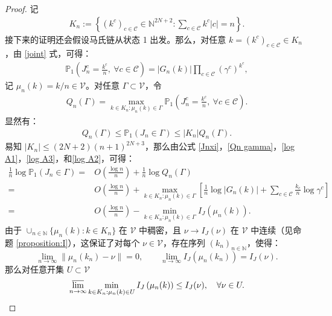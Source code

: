 \begin{proof}
记
\begin{align}\label{set:K_n}
K_n := \left\{(k^c)_{c\in \mathcal{C}}\in \mathbb{N}^{2N+2}: \sum_{c \in \mathcal{C}} k^{c} |c| =n \right\}.
\end{align}
接下来的证明还会假设马氏链从状态 1 出发。那么，对任意 $k=(k^c)_{c\in\mathcal{C}}\in K_n$，由 \eqref{joint} 式，可得：
\begin{align}\label{Jnxi}
\mathbb{P}_1\left(J^c_{n}= \frac{k^c}{n},\ \forall c\in \mathcal{C}\right)
= |G_n(k)| \prod_{c\in\mathcal{C}}\left(\gamma^c\right)^{k^c},
\end{align}
记 $\mu_n(k) = k/n\in\mathcal{V}$。对任意 $\Gamma\subset \mathcal{V}$，令
\begin{align*}
Q_n(\Gamma) = \max_{k\in K_n: \mu_n(k) \in \Gamma}
\mathbb{P}_1\left(J^c_{n} = \frac{k^c}{n},\ \forall c\in\mathcal{C}\right).
\end{align*}
显然有：
\begin{align}\label{Qn gamma}
	Q_n(\Gamma)
	\le \mathbb{P}_1\left(J_{n} \in \Gamma\right)
	\le |K_n| Q_n(\Gamma).
\end{align}
易知 $|K_n| \le (2N+2)(n+1)^{2N+3}$，那么由公式 \eqref{Jnxi}，\eqref{Qn gamma}，\eqref{log A1}，\eqref{log A3}，和\eqref{log A2}，可得：
\begin{equation}\label{1 n log P}
	\begin{split}
	\frac{1}{n}\log\mathbb{P}_1\left(J_{n} \in \Gamma\right)=&O\left(\frac{\log n}{n}\right)+\frac{1}{n}\log Q_n(\Gamma)\\
	=&O\left(\frac{\log n}{n}\right)+\max_{k\in K_n: \mu_n(k) \in \Gamma}\left[\frac{1}{n}\log |G_{n}(k)|+\sum_{c \in \mathcal{C}}\frac{k_c}{n}\log \gamma^c\right]\\
	=&O\left(\frac{\log n}{n}\right)-\min_{k\in K_n: \mu_n(k) \in \Gamma}I_J\left(\mu_{n}(k)\right).
	\end{split}
\end{equation}
由于 $\cup_{n\in\mathbb{N}} \{\mu_{n}(k):k\in K_n\}$ 在 $\mathcal{V}$ 中稠密，且 $\nu\to I_J(\nu)$ 在 $\mathcal{V}$ 中连续（见命题 \ref{proposition:I}），这保证了对每个 $\nu\in \mathcal{V}$，存在序列 $(k_n)_{n\in \mathbb{N}}$，使得：
\begin{equation*}
\lim_{n\to\infty} \|\mu_{n}(k_n)-\nu\| = 0, \qquad \lim_{n\to\infty} I_J\left(\mu_{n}(k_n)\right) = I_J(\nu).
\end{equation*}
那么对任意开集 $U\subset \mathcal{V}$
\begin{equation*}
\varlimsup_{n\to\infty}\min_{k\in K_n: \mu_n(k) \in U}I_J\left(\mu_{n}(k)\right)\le I_J(\nu),\quad\forall\nu\in U.

\end{equation*}
\end{proof}
